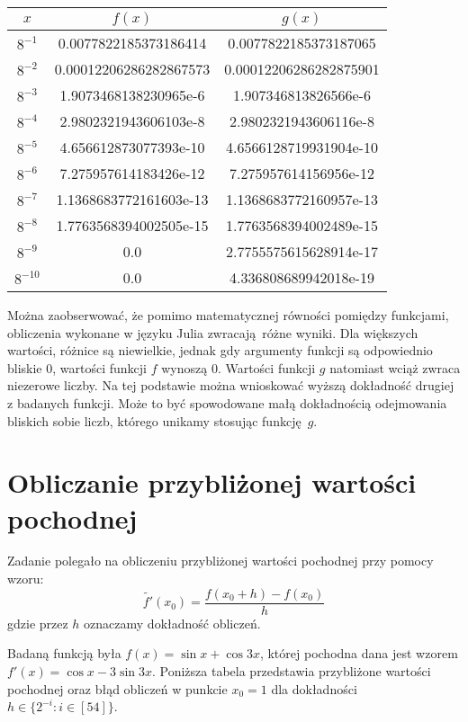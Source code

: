\documentclass{article}
\begin{document}
\begin{center}
  \begin{tabular}{| c | c | c |}
    \hline
    $x$ & $f(x)$ & $g(x)$ \\
    \hline
    $8^{-1}$ & 0.0077822185373186414 & 0.0077822185373187065 \\
    $8^{-2}$ & 0.00012206286282867573 & 0.00012206286282875901 \\
    $8^{-3}$ & 1.9073468138230965e-6 & 1.907346813826566e-6 \\
    $8^{-4}$ & 2.9802321943606103e-8 & 2.9802321943606116e-8 \\
    $8^{-5}$ & 4.656612873077393e-10 & 4.6566128719931904e-10 \\
    $8^{-6}$ & 7.275957614183426e-12 & 7.275957614156956e-12 \\
    $8^{-7}$ & 1.1368683772161603e-13 & 1.1368683772160957e-13 \\
    $8^{-8}$ & 1.7763568394002505e-15 & 1.7763568394002489e-15 \\
    $8^{-9}$ & 0.0 & 2.7755575615628914e-17 \\
    $8^{-10}$ & 0.0 & 4.336808689942018e-19 \\
    \hline
  \end{tabular}
\end{center}

Można zaobserwować, że pomimo matematycznej równości pomiędzy funkcjami, obliczenia wykonane w języku Julia zwracają różne wyniki.
Dla większych wartości, różnice są niewielkie, jednak gdy argumenty funkcji są odpowiednio bliskie $0$, wartości funkcji $f$ wynoszą $0$.
Wartości funkcji $g$ natomiast wciąż zwraca niezerowe liczby.
Na tej podstawie można wnioskować wyższą dokładność drugiej z badanych funkcji.
Może to być spowodowane małą dokładnością odejmowania bliskich sobie liczb, którego unikamy stosując funkcję $g$.

\section{Obliczanie przybliżonej wartości pochodnej}

Zadanie polegało na obliczeniu przybliżonej wartości pochodnej przy pomocy wzoru:
$$
\widetilde{f'}(x_0) = \frac{f(x_0+h) - f(x_0)}{h}
$$
gdzie przez $h$ oznaczamy dokładność obliczeń.

Badaną funkcją była $f(x) = \sin x + \cos 3x$, której pochodna dana jest wzorem $f'(x) = \cos x - 3 \sin 3x$.
Poniższa tabela przedstawia przybliżone wartości pochodnej oraz błąd obliczeń w punkcie $x_0 = 1$ dla dokładności $h \in \{2^{-i}: i \in [54]\}$.
\end{document}
